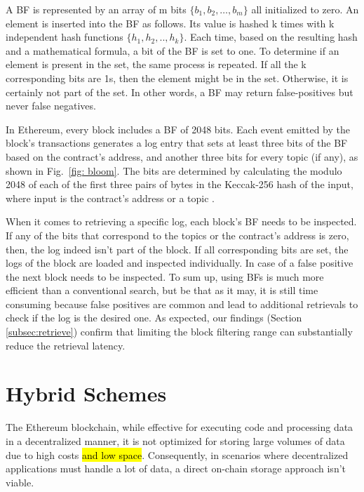 A BF is represented by an array of m bits $\{b_1, b_2,…, b_m\}$ all initialized to zero. An element is inserted into the BF as follows. Its value is hashed k times with k independent hash functions $\{h_1, h_2,.., h_k\}$. Each time, based on the resulting hash and a mathematical formula, a bit of the BF is set to one. To determine if an element is present in the set, the same process is repeated. If all the k corresponding bits are 1s, then the element might be in the set. Otherwise, it is certainly not part of the set. In other words, a BF may return false-positives but never false negatives.

In Ethereum, every block includes a BF of 2048 bits. Each event emitted by the block’s transactions generates a log entry that sets at least three bits of the BF based on the contract’s address, and another three bits for every topic (if any), as shown in Fig.~\ref{fig: bloom}. The bits are determined by calculating the modulo 2048 of each of the first three pairs of bytes in the Keccak-256 hash of the input, where input is the contract’s address or a topic  \citep{wood_2014}.

When it comes to retrieving a specific log, each block’s BF needs to be inspected. If any of the bits that correspond to the topics or the contract’s address is zero, then, the log indeed isn’t part of the block. If all corresponding bits are set, the logs of the block are loaded and inspected individually. In case of a false positive the next block needs to be inspected.
To sum up, using BFs is much more efficient than a conventional search, but be that as it may, it is still time consuming because false positives are common and lead to additional retrievals to check if the log is the desired one. As expected, our findings (Section \ref{subsec:retrieve}) confirm that limiting the block filtering range can substantially reduce the retrieval latency.

\section{Hybrid Schemes}\label{sec:}
The Ethereum blockchain, while effective for executing code and processing data in a decentralized manner, it is not optimized for storing large volumes of data due to high costs \hl{and low space}. Consequently, in scenarios where decentralized applications must handle a lot of data, a direct on-chain storage approach isn't viable.

